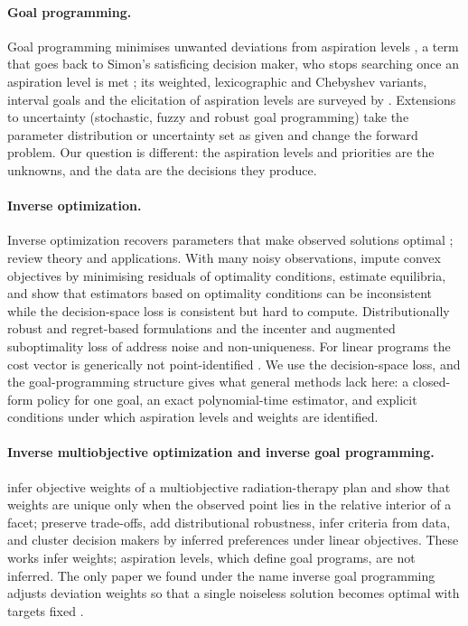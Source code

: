 \documentclass[11pt,a4paper]{article}
\theoremstyle{remark}\newtheorem{remark}{Remark}
\begin{document}
\paragraph{Goal programming.} Goal programming minimises unwanted deviations from aspiration levels \citep{charnes1961,charnes1977}, a term that goes back to Simon's satisficing decision maker, who stops searching once an aspiration level is met \citep{simon1955}; its weighted, lexicographic and Chebyshev variants, interval goals and the elicitation of aspiration levels are surveyed by \citet{tamiz1998}. Extensions to uncertainty (stochastic, fuzzy and robust goal programming) take the parameter distribution or uncertainty set as given and change the forward problem. Our question is different: the aspiration levels and priorities are the unknowns, and the data are the decisions they produce.

\paragraph{Inverse optimization.} Inverse optimization recovers parameters that make observed solutions optimal \citep{ahuja2001}; \citet{chan2025review} review theory and applications. With many noisy observations, \citet{keshavarz2011} impute convex objectives by minimising residuals of optimality conditions, \citet{bertsimas2015} estimate equilibria, and \citet{aswani2018} show that estimators based on optimality conditions can be inconsistent while the decision-space loss is consistent but hard to compute. Distributionally robust and regret-based formulations \citep{esfahani2018,besbes2025} and the incenter and augmented suboptimality loss of \citet{zattoni2025} address noise and non-uniqueness. For linear programs the cost vector is generically not point-identified \citep{ahmadi2026}. We use the decision-space loss, and the goal-programming structure gives what general methods lack here: a closed-form policy for one goal, an exact polynomial-time estimator, and explicit conditions under which aspiration levels and weights are identified.

\paragraph{Inverse multiobjective optimization and inverse goal programming.} \citet{chan2014} infer objective weights of a multiobjective radiation-therapy plan and show that weights are unique only when the observed point lies in the relative interior of a facet; \citet{chanlee2018} preserve trade-offs, \citet{dongzeng2021} add distributional robustness, \citet{gebken2021} infer criteria from data, and \citet{carrizosa2026} cluster decision makers by inferred preferences under linear objectives. These works infer weights; aspiration levels, which define goal programs, are not inferred. The only paper we found under the name inverse goal programming adjusts deviation weights so that a single noiseless solution becomes optimal with targets fixed \citep{saif2023}.
\end{document}
